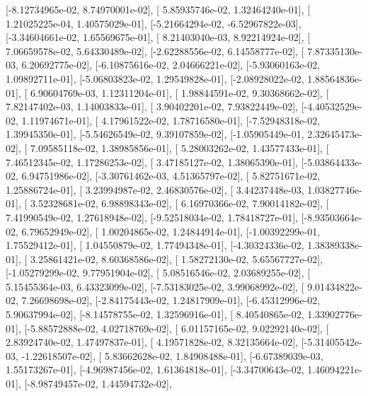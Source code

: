 \documentclass{article}
\begin{document}
       [-8.12734965e-02,  8.74970001e-02],
       [ 5.85935746e-02,  1.32464240e-01],
       [ 1.21025225e-04,  1.40575029e-01],
       [-5.21664294e-02, -6.52967822e-03],
       [-3.34604661e-02,  1.65569675e-01],
       [ 8.21403040e-03,  8.92214924e-02],
       [ 7.06659578e-02,  5.64330489e-02],
       [-2.62288556e-02,  6.14558777e-02],
       [ 7.87335130e-03,  6.20692775e-02],
       [-6.10875616e-02,  2.04666221e-02],
       [-5.93060163e-02,  1.09892711e-01],
       [-5.06803823e-02,  1.29549828e-01],
       [-2.08928022e-02,  1.88564836e-01],
       [ 6.90604769e-03,  1.12311204e-01],
       [ 1.98844591e-02,  9.30368662e-02],
       [ 7.82147402e-03,  1.14003833e-01],
       [ 3.90402201e-02,  7.93822449e-02],
       [-4.40532529e-02,  1.11974671e-01],
       [ 4.17961522e-02,  1.78716580e-01],
       [-7.52948318e-02,  1.39945350e-01],
       [-5.54626549e-02,  9.39107859e-02],
       [-1.05905449e-01,  2.32645473e-02],
       [ 7.09585118e-02,  1.38985856e-01],
       [ 5.28003262e-02,  1.43577433e-01],
       [ 7.46512345e-02,  1.17286253e-02],
       [ 3.47185127e-02,  1.38065390e-01],
       [-5.03864433e-02,  6.94751986e-02],
       [-3.30761462e-03,  4.51365797e-02],
       [ 5.82751671e-02,  1.25886724e-01],
       [ 3.23994987e-02,  2.46830576e-02],
       [ 3.44237448e-03,  1.03827746e-01],
       [ 3.52328681e-02,  6.98898343e-02],
       [ 6.16970366e-02,  7.90014182e-02],
       [ 7.41990549e-02,  1.27618948e-02],
       [-9.52518034e-02,  1.78418727e-01],
       [-8.93503664e-02,  6.79652949e-02],
       [ 1.00204865e-02,  1.24844914e-01],
       [-1.00392299e-01,  1.75529412e-01],
       [ 1.04550879e-02,  1.77494348e-01],
       [-4.30324336e-02,  1.38389338e-01],
       [ 3.25861421e-02,  8.60368586e-02],
       [ 1.58272130e-02,  5.65567727e-02],
       [-1.05279299e-02,  9.77951904e-02],
       [ 5.08516546e-02,  2.03689255e-02],
       [ 5.15455364e-03,  6.43323099e-02],
       [-7.53183025e-02,  3.99068992e-02],
       [ 9.01434822e-02,  7.26698698e-02],
       [-2.84175443e-02,  1.24817909e-01],
       [-6.45312996e-02,  5.90637994e-02],
       [-8.14578755e-02,  1.32596916e-01],
       [ 8.40540865e-02,  1.33902776e-01],
       [-5.88572888e-02,  4.02718769e-02],
       [ 6.01157165e-02,  9.02292140e-02],
       [ 2.83924740e-02,  1.47497837e-01],
       [ 4.19571828e-02,  8.32135664e-02],
       [-5.31405542e-03, -1.22618507e-02],
       [ 5.83662628e-02,  1.84908488e-01],
       [-6.67389039e-03,  1.55173267e-01],
       [-4.96987456e-02,  1.61364818e-01],
       [-3.34700643e-02,  1.46094221e-01],
       [-8.98749457e-02,  1.44594732e-02],
\end{document}
